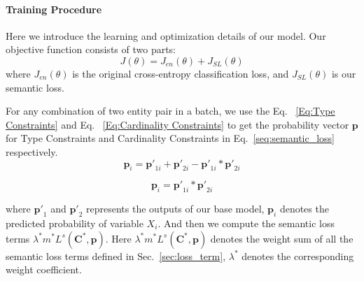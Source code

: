 \paragraph{Training Procedure}
Here we introduce the learning and optimization details of our model. Our objective function consists of two parts:
\begin{equation}
	J(\theta) = J_{en}(\theta) + J_{SL}(\theta)
\end{equation}
where  $J_{en}(\theta)$ is the original cross-entropy classification loss, and $J_{SL}(\theta)$ is our semantic loss.



For any combination of two entity pair in a batch, we use the Eq. ~\ref{Eq:Type Constraints} and Eq. ~\ref{Eq:Cardinality Constraints} to get the probability vector $\bm{p}$ for Type Constraints and Cardinality Constraints in Eq.~\ref{seq:semantic_loss} respectively.
\begin{equation}
\label{Eq:Type Constraints}
\bm{p}_{i} = \bm{p'}_{1i} + \bm{p'}_{2i} - \bm{p'}_{1i}*\bm{p'}_{2i}
\end{equation}

\begin{equation}
\label{Eq:Cardinality Constraints}
\bm{p}_{i} = \bm{p'}_{1i}*\bm{p'}_{2i}
\end{equation}

where $\bm{p'}_1$ and $\bm{p'}_2$ represents the outputs of our base model, $\bm{p}_{i}$ denotes the predicted probability of variable $X_i$.
And then we compute the semantic loss terms $\lambda ^{*}m^{*}L^{s}(\bm{C}^{*}, \bm{p})$.
Here $\lambda ^{*}m^{*}L^{s}(\bm{C}^{*}, \bm{p})$ denotes the weight sum of all the semantic loss terms defined in Sec.~\ref{sec:loss_term}, $\lambda^{*}$ denotes the corresponding weight coefficient.

